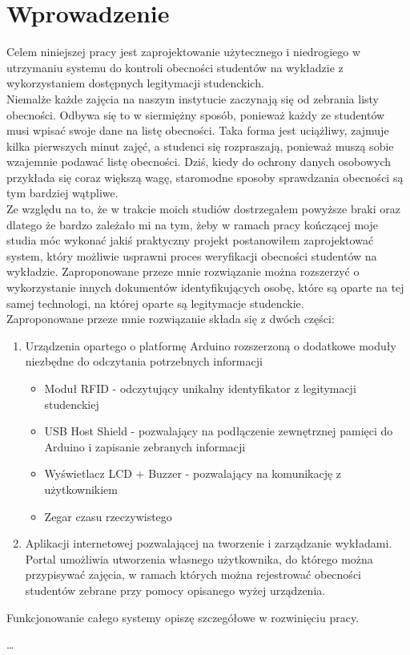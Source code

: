 \documentclass[declaration,shortabstract, mgr]{iithesis}
\author         {Dawid Szczyrk}
\begin{document}
\chapter{Wprowadzenie}

Celem niniejszej pracy jest zaprojektowanie użytecznego i niedrogiego w utrzymaniu systemu do kontroli obecności studentów na wykładzie z wykorzystaniem dostępnych legitymacji studenckich.\\
\indent Niemalże każde zajęcia na naszym instytucie zaczynają się od zebrania listy obecności. Odbywa się to w siermiężny sposób, ponieważ każdy ze studentów musi wpisać swoje dane na listę obecności.
Taka forma jest uciążliwy, zajmuje kilka pierwszych minut zajęć, a studenci się rozpraszają, ponieważ muszą sobie wzajemnie podawać listę obecności. Dziś, kiedy do ochrony danych osobowych przykłada się
coraz większą wagę, staromodne sposoby sprawdzania obecności są tym bardziej wątpliwe.\\
\indent Ze względu na to, że w trakcie moich studiów dostrzegałem powyższe braki oraz dlatego że bardzo zależało mi na tym, żeby w ramach pracy kończącej moje studia móc wykonać jakiś praktyczny projekt postanowiłem 
zaprojektować system, który możliwie usprawni proces weryfikacji obecności studentów na wykładzie. Zaproponowane przeze mnie rozwiązanie można rozszerzyć o wykorzystanie innych dokumentów identyfikujących
osobę, które są oparte na tej samej technologi, na której oparte są legitymacje studenckie.\\
\indent Zaproponowane przeze mnie rozwiązanie składa się z dwóch części:
\begin{enumerate}
\item Urządzenia opartego o platformę Arduino rozszerzoną o dodatkowe moduły niezbędne do odczytania potrzebnych informacji
\begin{itemize}
  \item Moduł RFID - odczytujący unikalny identyfikator z legitymacji studenckiej
  \item USB Host Shield - pozwalający na podłączenie zewnętrznej pamięci do Arduino i zapisanie zebranych informacji
  \item Wyświetlacz LCD + Buzzer - pozwalający na komunikację z użytkownikiem
  \item Zegar czasu rzeczywistego
\end{itemize}
\item Aplikacji internetowej pozwalającej na tworzenie i zarządzanie wykładami. Portal umożliwia utworzenia własnego użytkownika, do którego można przypisywać zajęcia, w ramach których można rejestrować obecności studentów
zebrane przy pomocy opisanego wyżej urządzenia.
\end{enumerate}
Funkcjonowanie całego systemy opiszę szczegółowe w rozwinięciu pracy.

\ldots


\end{document}
